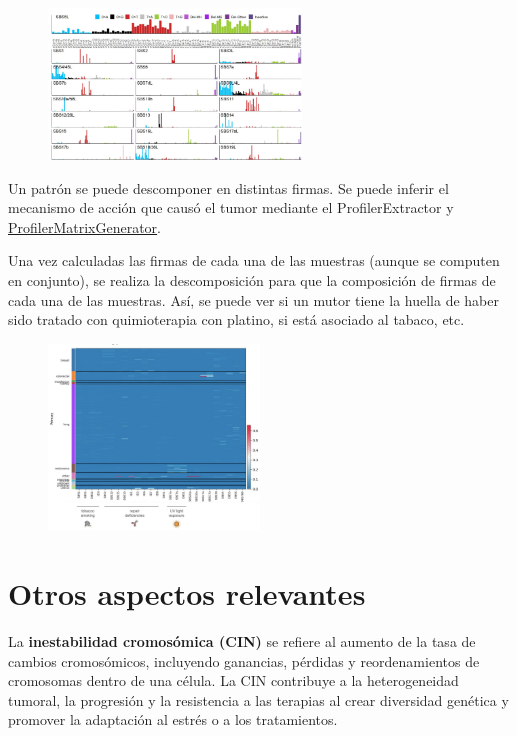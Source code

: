 \begin{figure}[htbp]
\centering
\includegraphics[width =0.6\textwidth]{figs/mutational-signatures.png}
\end{figure}

Un patrón se puede descomponer en distintas firmas. Se puede inferir el mecanismo de acción que causó el tumor mediante el ProfilerExtractor y \href{https://github.com/AlexandrovLab/SigProfilerMatrixGenerator}{ProfilerMatrixGenerator}. 

Una vez calculadas las firmas de cada una de las muestras (aunque se computen en conjunto), se realiza la descomposición para que la composición de firmas de cada una de las muestras. Así, se puede ver si un mutor tiene la huella de haber sido tratado con quimioterapia con platino, si está asociado al tabaco, etc. 

\begin{figure}[htbp]
\centering
\includegraphics[width = 0.5\textwidth]{figs/heatmap.png}
\end{figure}


\section{Otros aspectos relevantes}
La \textbf{inestabilidad cromosómica (CIN)} se refiere al aumento de la tasa de cambios cromosómicos, incluyendo ganancias, pérdidas y reordenamientos de cromosomas dentro de una célula. La CIN contribuye a la heterogeneidad tumoral, la progresión y la resistencia a las terapias al crear diversidad genética y promover la adaptación al estrés o a los tratamientos.

